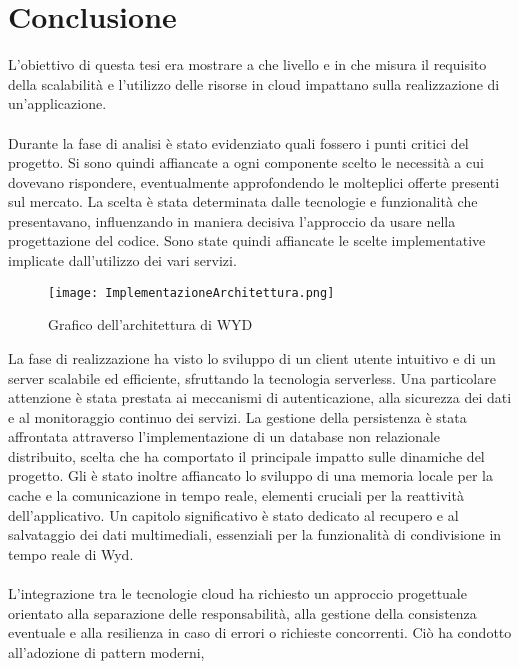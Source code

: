 \chapter*{Conclusione}
L'obiettivo di questa tesi era mostrare a che livello e in che misura
il requisito della scalabilità e l'utilizzo delle risorse in cloud impattano sulla realizzazione di un'applicazione.\\
\\
Durante la fase di analisi è stato evidenziato quali fossero i punti critici del progetto.
Si sono quindi affiancate a ogni componente scelto le necessità a cui dovevano rispondere,
eventualmente approfondendo le molteplici offerte presenti sul mercato.
La scelta è stata determinata dalle tecnologie e funzionalità che presentavano, 
influenzando in maniera decisiva l'approccio da usare
nella progettazione del codice.
Sono state quindi affiancate le scelte implementative implicate dall'utilizzo dei vari servizi.\\
\begin{figure}[htbp]
    \begin{center}
        \texttt{[image: ImplementazioneArchitettura.png]}
        \caption{Grafico dell'architettura di WYD}
    \end{center}
\end{figure}
\clearpage
La fase di realizzazione ha visto lo sviluppo di un client utente intuitivo 
e di un server scalabile ed efficiente, sfruttando la tecnologia serverless.
Una particolare attenzione è stata prestata ai meccanismi di autenticazione, 
alla sicurezza dei dati e al monitoraggio continuo dei servizi.
La gestione della persistenza è stata affrontata 
attraverso l'implementazione di un database non relazionale distribuito,
scelta che ha comportato il principale impatto sulle dinamiche del progetto.
Gli è stato inoltre affiancato lo sviluppo 
di una memoria locale per la cache e la comunicazione in tempo reale, 
elementi cruciali per la reattività dell'applicativo.
Un capitolo significativo è stato dedicato al recupero e al salvataggio dei dati multimediali, 
essenziali per la funzionalità di condivisione in tempo reale di Wyd.\\
\\
L'integrazione tra le tecnologie cloud ha richiesto 
un approccio progettuale orientato alla separazione delle responsabilità, 
alla gestione della consistenza eventuale e alla resilienza in caso di errori o richieste concorrenti. Ciò ha condotto all'adozione di pattern moderni, 
